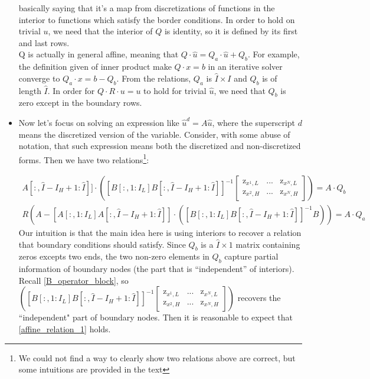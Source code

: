 \documentclass[11pt]{article}
\begin{document}
\begin{itemize}
		basically saying that it's a map from discretizations of functions in the interior to functions which satisfy the border conditions. In order to hold on trivial $u$, we need that the interior of $Q$ is identity, so it is defined by its first and last rows.\\
		Q is actually in general affine, meaning that $Q\cdot \hat{u} = Q_a\cdot \hat{u} + Q_b$. For example, the definition given of inner product make $Q\cdot x=b$ in an iterative solver converge to $Q_a\cdot x = b - Q_b$. From the relations, $Q_a$ is $\hat{I}\times I$ and $Q_b$ is of length $\hat{I}$. In order for $Q\cdot R\cdot u = u$ to hold for trivial $\hat{u}$, we need that $Q_b$ is zero except in the boundary rows.
		
		\item Now let's focus on solving an expression like $\hat{u}^d = A \hat{u}$, where the superscript $d$ means the discretized version of the variable. Consider, with some abuse of notation, that such expression means both the discretized and non-discretized forms. Then we have two relations\footnote{We could not find a way to clearly show two relations above are correct, but some intuitions are provided in the text}:
		
		\begin{align}
		[A[:, 1:I_L] A[:,\hat{I}-I_H+1:\hat{I}]]\cdot\left([B[:,1:I_L] B[:,\hat{I}-I_H+1:\hat{I}]]^{-1}\begin{bmatrix}
		\text{z}_{x^{1},L} & ... & \text{z}_{x^{N},L}\\
		\text{z}_{x^{2},H} & ... & \text{z}_{x^{N},H}
		\end{bmatrix}\right) = A\cdot Q_b\label{affine_relation_1}
		\end{align}
		\begin{align}
		R(A-[A[:,1:I_L] A[:,\hat{I}-I_H+1:\hat{I}]]\cdot([B[:,1:I_L] B[:,\hat{I}-I_H+1:\hat{I}]]^{-1} B)) = A\cdot Q_a\label{affine_relation_2}
		\end{align}		
Our intuition is that the main idea here is using interiors to recover a relation that boundary conditions should satisfy. Since $Q_b$ is a $\hat{I}\times 1$ matrix containing zeros excepts two ends, the two non-zero elements in $Q_b$ capture partial information of boundary nodes (the part that is ``independent'' of interiors).  Recall \eqref{B_operator_block}, so $\left([B[:,1:I_L] B[:,\hat{I}-I_H+1:\hat{I}]]^{-1}\begin{bmatrix}
		\text{z}_{x^{1},L} & ... & \text{z}_{x^{N},L}\\
		\text{z}_{x^{2},H} & ... & \text{z}_{x^{N},H}
		\end{bmatrix}\right)$ recovers the ``independent" part of boundary nodes. Then it is reasonable to expect that \eqref{affine_relation_1} holds.
		

\end{itemize}
\end{document}
